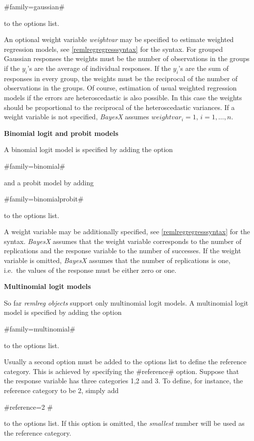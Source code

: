 #family=gaussian#

to the options list.

An optional weight variable {\em weightvar} may be specified to
estimate weighted regression models, see
\autoref{remlregregresssyntax} for the syntax. For grouped
Gaussian responses the weights must be the number of observations
in the groups if the $y_i$'s are the average of individual
responses. If the $y_i$'s are the sum of responses in every group,
the weights must be the reciprocal of the number of observations
in the groups. Of course, estimation of usual weighted regression
models if the errors are heteroscedastic is also possible. In this
case the weights should be proportional to the reciprocal of the
heteroscedastic variances. If a weight variable is not specified,
{\em BayesX} assumes $weightvar_i = 1$, $i=1,\dots,n$.

{\bf Binomial logit and probit models}

A binomial logit model is specified by adding the option

#family=binomial#

and a probit model by adding

#family=binomialprobit#

to the options list.

A weight variable may be additionally specified, see
\autoref{remlregregresssyntax} for the syntax. {\em BayesX}
assumes that the weight variable corresponds to the number of
replications and the response variable to the number of successes.
If the weight variable is omitted, {\em BayesX} assumes that the
number of replications is one, i.e.~the values of the response
must be either zero or one.

{\bf Multinomial logit models}

So far {\em remlreg objects} support only multinomial logit
models. A multinomial logit model is specified by adding the
option

#family=multinomial#

to the options list.

Usually a second option must be added to the options list to
define the reference category. This is achieved by specifying the
#reference# option. Suppose that the response variable has three
categories 1,2 and 3. To define, for instance, the reference
category to be 2, simply add

#reference=2 #

to the options list. If this option is omitted, the {\em smallest}
number will be used as the reference category.

